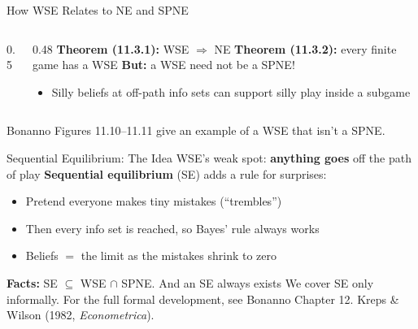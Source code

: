 \begin{frame}{How WSE Relates to NE and SPNE}
\begin{columns}[c]
\begin{column}{0.5\textwidth}
\centering
{}
\end{column}
\begin{column}{0.48\textwidth}
\textbf{Theorem (11.3.1):} WSE $\Rightarrow$ NE
\bsk
\textbf{Theorem (11.3.2):} every finite game has a WSE
\bsk
\textbf{But:} a WSE need not be a SPNE!
\begin{itemize}
    \item Silly beliefs at off-path info sets can support silly play inside a subgame
\end{itemize}
\bsk
{}
\end{column}
\end{columns}
\vfill
{\footnotesize Bonanno Figures 11.10--11.11 give an example of a WSE that isn't a SPNE.}
\vspace{-0.2in}
\end{frame}

\begin{frame}{Sequential Equilibrium: The Idea}
WSE's weak spot: \textbf{anything goes} off the path of play
\bsk
\textbf{Sequential equilibrium} (SE) adds a rule for surprises:
\begin{itemize}
    \item Pretend everyone makes tiny mistakes (``trembles'')
    \item Then every info set is reached, so Bayes' rule always works
    \item Beliefs $=$ the limit as the mistakes shrink to zero
\end{itemize}
\bsk
\textbf{Facts:} SE $\subseteq$ WSE $\cap$ SPNE. And an SE always exists
\bsk
{}
\vfill
{\footnotesize We cover SE only informally. For the full formal development, see Bonanno Chapter 12. Kreps \& Wilson (1982, \textit{Econometrica}).}
\vspace{-0.2in}
\end{frame}


